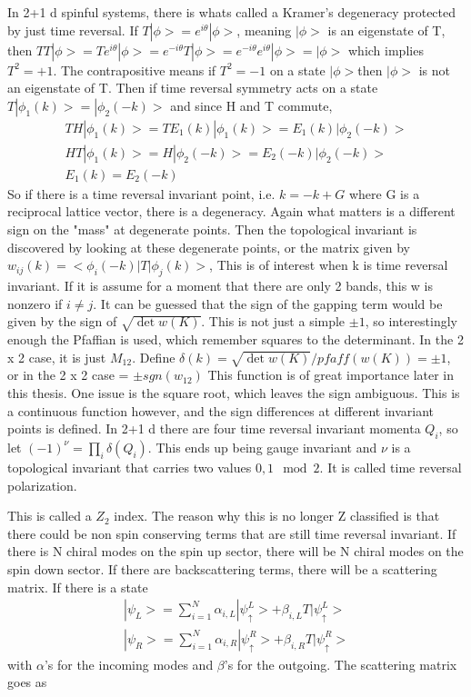 In 2+1 d spinful systems, there is whats called a Kramer's degeneracy protected by just time reversal. If $T|\phi>= e^{i\theta}|\phi>$, meaning $|\phi>$ is an eigenstate of T, then $TT|\phi> = T e^{i\theta}|\phi> = e^{-i\theta}T|\phi>=e^{-i\theta}e^{i\theta}|\phi>= |\phi>$ which implies $T^2=+1$. The contrapositive means if $T^2=-1$ on a state $|\phi>$then $|\phi>$ is not an eigenstate of T. Then if time reversal symmetry acts on a state $T|\phi_1(k)> = |\phi_2(-k)>$ and since H and T commute,
\begin{align}
TH|\phi_1(k)> = TE_1(k)|\phi_1(k)> = E_1(k)|\phi_2(-k)> \\
HT|\phi_1(k)> = H|\phi_2(-k)> = E_2(-k)|\phi_2(-k)> \\
E_1(k)=E_2(-k)
\end{align} 
So if there is a time reversal invariant point, i.e. $k=-k+G$ where G is a reciprocal lattice vector, there is a degeneracy. Again what matters is a different sign on the "mass" at degenerate points. Then the topological invariant is discovered by looking at these degenerate points, or the matrix given by $w_{ij}(k) = <\phi_i(-k)|T|\phi_j(k)>$, This is of interest when k is time reversal invariant. If it is assume for a moment that there are only 2 bands, this w is nonzero if $i\ne j$. It can be guessed that the sign of the gapping term would be given by the sign of $ \sqrt{\det{w(K)}}$. This is not just a simple $\pm1$, so interestingly enough the Pfaffian is used, which remember squares to the determinant. In the 2 x 2 case, it is just $M_{12}$. Define $\delta(k) = \sqrt{\det{w(K)}}/pfaff(w(K)) = \pm 1$, or in the 2 x 2 case = $\pm sgn(w_{12})$ This function is of great importance later in this thesis. One issue is the square root, which leaves the sign ambiguous. This is a continuous function however, and the sign differences at different invariant points is defined. In 2+1 d there are four time reversal invariant momenta $Q_i$, so let $(-1)^\nu = \prod_i \delta(Q_i)$. This ends up being gauge invariant and $\nu$ is a topological invariant that carries two values $0,1\mod 2$. It is called time reversal polarization.

This is called a $Z_2$ index. The reason why this is no longer Z classified is that there could be non spin conserving terms that are still time reversal invariant. If there is N chiral modes on the spin up sector, there will be N chiral modes on the spin down sector. If there are backscattering terms, there will be a scattering matrix. If  there is a state
\begin{align}
|\psi_{L}>=\sum_{i=1}^N \alpha_{i,L}|\psi_\uparrow^L>+\beta_{i,L} T|\psi_\uparrow^L> \\
|\psi_{R}>=\sum_{i=1}^N \alpha_{i,R}|\psi_\uparrow^R>+\beta_{i,R} T|\psi_\uparrow^R>  
\end{align}
with $\alpha$'s for the incoming modes and $\beta$'s for the outgoing. The scattering matrix goes as 

